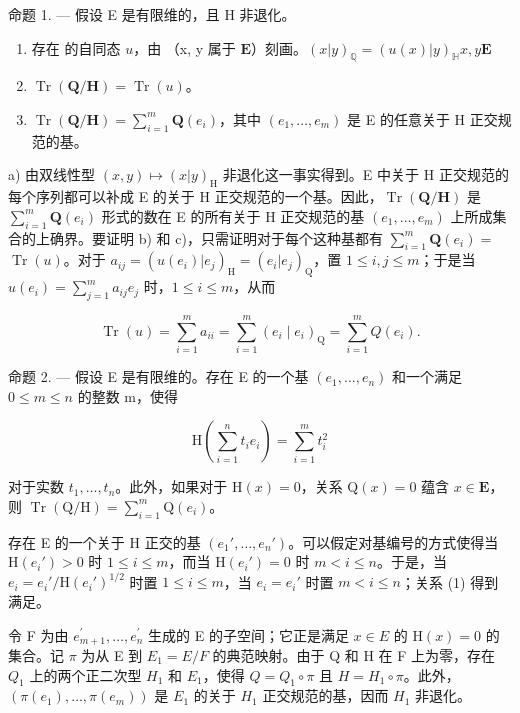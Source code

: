 命题 1. --- 假设 E 是有限维的，且 H 非退化。

\begin{enumerate}
\def\labelenumi{\alph{enumi})}
\item
  存在  的自同态 \(u\)，由 （x, y 属于 \(\mathbf{E}\)）刻画。\((x|y)_{\mathbb{Q}} = (u(x)|y)_{\mathbb{H}}\)\(x, y\)\(\mathbf{E}\)
\item
  \(\operatorname{Tr}(\mathbf{Q} / \mathbf{H}) = \operatorname{Tr}(u)\)。
\item
  \(\operatorname{Tr}(\mathbf{Q} / \mathbf{H}) = \sum_{i=1}^{m} \mathbf{Q}(e_i)\)，其中 \((e_1, \ldots, e_m)\) 是 E 的任意关于 H 正交规范的基。
\end{enumerate}

 a) 由双线性型 \((x,y)\mapsto (x|y)_{\mathrm{H}}\) 非退化这一事实得到。E 中关于 H 正交规范的每个序列都可以补成 E 的关于 H 正交规范的一个基。因此，\(\operatorname {Tr}(\mathbf{Q} / \mathbf{H})\) 是 \(\sum_{i = 1}^{m}\mathbf{Q}(e_i)\) 形式的数在 E 的所有关于 H 正交规范的基 \((e_1,\ldots ,e_m)\) 上所成集合的上确界。要证明 b) 和 c)，只需证明对于每个这种基都有 \(\sum_{i = 1}^{m}\mathbf{Q}(e_i) =\) \(\operatorname {Tr}(u)\)。对于 \(a_{ij} = (u(e_i)|e_j)_{\mathrm{H}} = (e_i|e_j)_{\mathrm{Q}}\)，置 \(1\leqslant i,j\leqslant m\)；于是当 \(u(e_i) = \sum_{j = 1}^{m}a_{ij}e_j\) 时，\(1\leqslant i\leqslant m\)，从而

\[
\operatorname{Tr} (u) = \sum_ {i = 1} ^ {m} a _ {i i} = \sum_ {i = 1} ^ {m} \left(e _ {i} \mid e _ {i}\right) _ {\mathrm{Q}} = \sum_ {i = 1} ^ {m} Q \left(e _ {i}\right).\tag{Q.E.D.}
\]

命题 2. --- 假设 E 是有限维的。存在 E 的一个基 \((e_{1},\ldots,e_{n})\) 和一个满足 \(0\leqslant m\leqslant n\) 的整数 m，使得

\[
\mathrm{H} \left(\sum_ {i = 1} ^ {n} t _ {i} e _ {i}\right) = \sum_ {i = 1} ^ {m} t _ {i} ^ {2}\tag{1}
\]

对于实数 \(t_1, \ldots, t_n\)。此外，如果对于 \(\mathrm{H}(x) = 0\)，关系 \(\mathrm{Q}(x) = 0\) 蕴含 \(x \in \mathbf{E}\)，则 \(\operatorname{Tr}(\mathrm{Q}/\mathrm{H}) = \sum_{i=1}^{m} \mathrm{Q}(e_i)\)。

存在 E 的一个关于 H 正交的基 \((e_1', \ldots, e_n')\)。可以假定对基编号的方式使得当 \(\mathrm{H}(e_i') > 0\) 时 \(1 \leqslant i \leqslant m\)，而当 \(\mathrm{H}(e_i') = 0\) 时 \(m < i \leqslant n\)。于是，当 \(e_i = e_i' / \mathrm{H}(e_i')^{1/2}\) 时置 \(1 \leqslant i \leqslant m\)，当 \(e_i = e_i'\) 时置 \(m < i \leqslant n\)；关系 (1) 得到满足。

令 F 为由 \(e_{m+1}^{\prime},\ldots,e_{n}^{\prime}\) 生成的 E 的子空间；它正是满足 \(x\in E\) 的 \(\mathrm{H}(x)=0\) 的集合。记 \(\pi\) 为从 E 到 \(E_{1}=E/F\) 的典范映射。由于 Q 和 H 在 F 上为零，存在 \(Q_{1}\) 上的两个正二次型 \(H_{1}\) 和 \(E_{1}\)，使得 \(Q=Q_{1}\circ\pi\) 且 \(H=H_{1}\circ\pi\)。此外，\((\pi(e_{1}),\ldots,\pi(e_{m}))\) 是 \(E_{1}\) 的关于 \(H_{1}\) 正交规范的基，因而 \(H_{1}\) 非退化。

